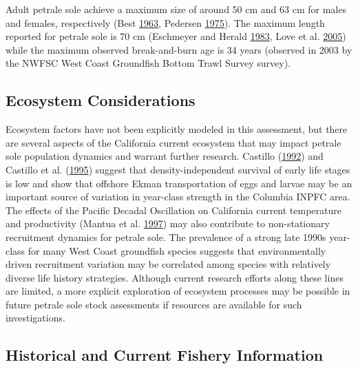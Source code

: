 \documentclass[12pt,]{article}
\begin{document}
Adult petrale sole achieve a maximum size of around 50 cm and 63 cm for
males and females, respectively (Best
\protect\hyperlink{ref-best_e.a._movements_1963}{1963}, Pedersen
\protect\hyperlink{ref-pedersen_movements_1975}{1975}). The maximum
length reported for petrale sole is 70 cm (Eschmeyer and Herald
\protect\hyperlink{ref-eschmeyer_field_1983}{1983}, Love et al.
\protect\hyperlink{ref-love_milton_resource_2005}{2005}) while the
maximum observed break-and-burn age is 34 years (observed in 2003 by the
NWFSC West Coast Groundfish Bottom Trawl Survey survey).

\subsection{Ecosystem Considerations}\label{ecosystem-considerations-1}

Ecosystem factors have not been explicitly modeled in this assessment,
but there are several aspects of the California current ecosystem that
may impact petrale sole population dynamics and warrant further
research. Castillo
(\protect\hyperlink{ref-castillo_g.c._fluctuations_1992}{1992}) and
Castillo et al.
(\protect\hyperlink{ref-castillo_latitudinal_1995}{1995}) suggest that
density-independent survival of early life stages is low and show that
offshore Ekman transportation of eggs and larvae may be an important
source of variation in year-class strength in the Columbia INPFC area.
The effects of the Pacific Decadal Oscillation on California current
temperature and productivity (Mantua et al.
\protect\hyperlink{ref-mantua_pacific_1997}{1997}) may also contribute
to non-stationary recruitment dynamics for petrale sole. The prevalence
of a strong late 1990s year-class for many West Coast groundfish species
suggests that environmentally driven recruitment variation may be
correlated among species with relatively diverse life history
strategies. Although current research efforts along these lines are
limited, a more explicit exploration of ecosystem processes may be
possible in future petrale sole stock assessments if resources are
available for such investigations.

\subsection{Historical and Current Fishery
Information}\label{historical-and-current-fishery-information}
\end{document}
